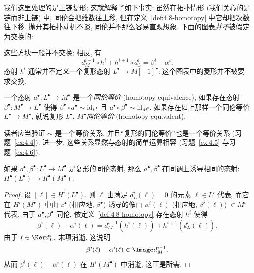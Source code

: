 \indent 我们这里处理的是上链复形; 这就解释了如下事实: 虽然在拓扑情形 (我们关心的是链而非上链) 中, 同伦会把维数往上移, 但在定义~\ref{def:4.8-homotopy} 中它却把次数往下移.
抛开其拓扑动机不谈, 同伦并不那么容易直观想象. 下面的图表\emph{并不}被假定为交换的:
\begin{center}
\end{center}
这些方块一般并不交换; 相反, 有
\[
d_M^{i-1}\circ h^i+h^{i+1}\circ d_L^i=\beta^i-\alpha^i.
\]
态射 $h^i$ 通常并不定义一个复形态射 $L^\bullet\to M[-1]^\bullet$: 这个图表中的菱形并不被要求交换.

\begin{definition}\label{def:4.9-homotopy-equivalence}
一个态射 $a^\bullet:L^\bullet\to M^\bullet$ 是一个\emph{同伦等价} (homotopy equivalence), 如果存在态射 $\beta^\bullet:M^\bullet\to L^\bullet$ 使得 $\beta^\bullet\circ a^\bullet\sim\mathrm{id}_{L^\bullet}$ 且 $a^\bullet\circ\beta^\bullet\sim\mathrm{id}_{M^\bullet}$. 如果存在如上那样一个同伦等价 $L^\bullet\to M^\bullet$, 就说复形 $L^\bullet$, $M^\bullet$\emph{同伦等价} (homotopy equivalent).
\end{definition}

\indent 读者应当验证 $\sim$ 是一个等价关系, 并且``复形的同伦等价''也是一个等价关系 (习题~\ref{ex:4.4}). 进一步, 这些关系显然与态射的简单运算相容 (习题~\ref{ex:4.5} 与习题~\ref{ex:4.6}).

\begin{proposition}\label{prop:4.10-homotopy-same-cohomology}
如果 $a^\bullet,\beta^\bullet:L^\bullet\to M^\bullet$ 是复形的同伦态射, 那么 $a^\bullet,\beta^\bullet$ 在同调上诱导相同的态射: $H^\bullet(L^\bullet)\to H^\bullet(M^\bullet)$.
\end{proposition}

\begin{proof}
设 $[\ell]\in H^i(L^\bullet)$. 则 $\ell$ 由满足 $d_L^i(\ell)=0$ 的元素 $\ell\in L^i$ 代表, 而它在 $H^i(M^\bullet)$ 中由 $a^\bullet$ (相应地, $\beta^\bullet$) 诱导的像由 $\alpha^i(\ell)$ (相应地, $\beta^i(\ell)$) $\in M^i$ 代表. 由于 $a^\bullet,\beta^\bullet$ 同伦, 依定义~\ref{def:4.8-homotopy} 存在态射 $h^i$ 使得
\[
\beta^i(\ell)-\alpha^i(\ell)=d_M^{i-1}(h^i(\ell))+h^{i+1}(d_L^i(\ell)).
\]
由于 $\ell\in\Ker d_L^i$, 末项消逝. 这说明
\[
\beta^i(\ell)-\alpha^i(\ell)\in\Image d_M^{i-1},
\]
从而 $\beta^i(\ell)-\alpha^i(\ell)$ 在 $H^i(M^\bullet)$ 中消逝, 这正是所需.
\end{proof}

